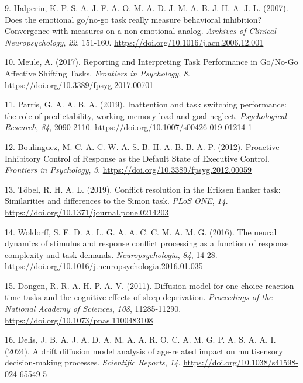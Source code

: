 \documentclass[
  spanish,
  10pt,
]{article}
\newlength{\cslhangindent}
\newenvironment{CSLReferences}[2] %
 {\begin{list}{}{%
  \setlength{\itemindent}{0pt}
  \setlength{\leftmargin}{0pt}
  \setlength{\parsep}{0pt}
  \ifodd #1
   \setlength{\leftmargin}{\cslhangindent}
   \setlength{\itemindent}{-1\cslhangindent}
  \fi
  \setlength{\itemsep}{#2\baselineskip}}}
 {\end{list}}
\begin{document}
\begin{CSLReferences}{1}{0}
9. Halperin, K. P. S. A. J. F. A. O. M. A. D. J. M. A. B. J. H. A. J. L.
(2007). Does the emotional go/no-go task really measure behavioral
inhibition?Convergence with measures on a non-emotional analog.
\emph{Archives of Clinical Neuropsychology}, \emph{22}, 151-160.
\url{https://doi.org/10.1016/j.acn.2006.12.001}

10. Meule, A. (2017). Reporting and Interpreting Task Performance in
Go/No-Go Affective Shifting Tasks. \emph{Frontiers in Psychology},
\emph{8}. \url{https://doi.org/10.3389/fpsyg.2017.00701}

11. Parris, G. A. A. B. A. (2019). Inattention and task switching
performance: the role of predictability, working memory load and goal
neglect. \emph{Psychological Research}, \emph{84}, 2090-2110.
\url{https://doi.org/10.1007/s00426-019-01214-1}

12. Boulinguez, M. C. A. C. W. A. S. B. H. A. B. B. A. P. (2012).
Proactive Inhibitory Control of Response as the Default State of
Executive Control. \emph{Frontiers in Psychology}, \emph{3}.
\url{https://doi.org/10.3389/fpsyg.2012.00059}

13. Töbel, R. H. A. L. (2019). Conflict resolution in the Eriksen
flanker task: Similarities and differences to the Simon task. \emph{PLoS
ONE}, \emph{14}. \url{https://doi.org/10.1371/journal.pone.0214203}

14. Woldorff, S. E. D. A. L. G. A. A. C. C. M. A. M. G. (2016). The
neural dynamics of stimulus and response conflict processing as a
function of response complexity and task demands.
\emph{Neuropsychologia}, \emph{84}, 14-28.
\url{https://doi.org/10.1016/j.neuropsychologia.2016.01.035}

15. Dongen, R. R. A. H. P. A. V. (2011). Diffusion model for one-choice
reaction-time tasks and the cognitive effects of sleep deprivation.
\emph{Proceedings of the National Academy of Sciences}, \emph{108},
11285-11290. \url{https://doi.org/10.1073/pnas.1100483108}

16. Delis, J. B. A. J. A. D. A. M. A. A. R. O. C. A. M. G. P. A. S. A.
A. I. (2024). A drift diffusion model analysis of age-related impact on
multisensory decision-making processes. \emph{Scientific Reports},
\emph{14}. \url{https://doi.org/10.1038/s41598-024-65549-5}


\end{CSLReferences}
\end{document}
